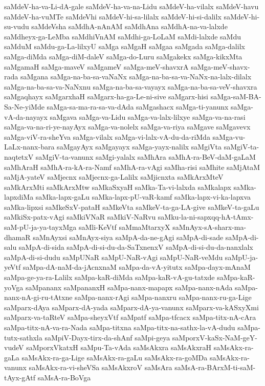 {saMdeV-ha-va-Li-dA-gale
saMdeV-ha-va-na-Lidu
saMdeV-ha-vilalx
saMdeV-havu
saMdeV-ha-vuMTe
saMdeVhi
saMdeV-hi-sa-lilalx
saMdeV-hi-si-dalilx
saMdeV-hi-su-vudu
saMdeVsha
saMdhA-nAnAM
saMdhAna
saMdhA-na-va-lalxde
saMdheyx-ga-LeMba
saMdhiVnAM
saMdhi-ga-LoLaM
saMdi-lalxde
saMdu
saMduM
saMdu-ga-La-lilxyU
saMga
saMgaH
saMgaa
saMgada
saMga-dalilx
saMga-diMda
saMga-diM-daleV
saMga-do-Luru
saMgakekx
saMga-kikxMta
saMgamaH
saMga-maveV
saMgameV
saMga-meV-shavxrA
saMga-meV-shavx-rada
saMgana
saMga-na-ba-sa-vaNaNx
saMga-na-ba-sa-va-NaNx-na-lalx-dilalx
saMga-na-ba-sa-va-NaNxnu
saMga-na-ba-sa-vayayx
saMga-na-ba-sa-veV-shavxra
saMgaqhayx
saMgarxhaH
saMgarx-ha-ga-Le-ni-sive
saMgarx-hisi
saMga-saM-BA-Sa-Ne-yiMde
saMga-sa-ma-ra-sa-va-dAda
saMgashacx
saMga-ti-yanunx
saMga-vA-da-nayayx
saMgava
saMga-va-Lidu
saMga-va-lalx-lilxye
saMga-va-na-rasi
saMga-va-na-ri-ye-nayAyx
saMga-va-nolelx
saMga-va-riya
saMgave
saMgavevx
saMga-viV-ra-sheYva
saMga-vilalx
saMga-vi-lalx-vA-du-da-riMda
saMga-vu-LaLx-nanx-bara
saMgayAyx
saMgayayx
saMga-yayx-nalilx
saMgiVta
saMgiV-ta-naqtetxV
saMgiV-ta-vanunx
saMgi-yalalx
saMhAra
saMhA-ra-BeV-daM-gaLaM
saMhAraH
saMhA-ra-kA-ra-Namf
saMhA-ra-vAgi
saMha-risi
saMhite
saMjAtaM
saMjA-yateV
saMjecnx
saMjecnx-ga-Lalilx
saMjicnxta
saMkArxMteV
saMkArxMti
saMkArxMtw
saMkaSxyaH
saMka-Ta-vi-lalxda
saMkalapx
saMka-lapxdiMa
saMka-lapx-gaLu
saMka-lapx-pU-vaR-kamf
saMka-lapx-vi-ka-lapxva
saMka-lipxsi
saMkeSxV-pataH
saMkeVta
saMkeV-ta-ga-LA-give
saMkeV-ta-gaLu
saMkiSx-patx-vAgi
saMkiVNaR
saMkiV-NaRvu
saMku-la-ni-sapxqq-hA-tAmx-saM-pU-ja-ya-tayxMga
saMli-KeVtf
saMmaMtarxyX
saMnAyx-sA-sharx-ma-dhamaR
saMnAyxsi
saMnAyx-siya
saMpA-da-ne-gAgi
saMpA-di-sade
saMpA-di-salu
saMpA-di-sida
saMpA-di-si-du-da-SaTxnenxV
saMpA-di-si-du-da-nanxlalx
saMpA-di-si-dudu
saMpUNaR
saMpU-NaR-vAgi
saMpU-NaR-veMdu
saMpU-ja-yeVtf
saMpa-dA-naM-da-jAcnxnaM
saMpa-da-vA-yitutx
saMpa-dayx-mAnaM
saMpa-ge-ya-ra-Lalilx
saMpa-kaR-diMda
saMpa-kaR-vA-gu-tatxde
saMpa-kaR-yoVga
saMpananx
saMpananxH
saMpa-nanx-mapapx
saMpa-nanx-nAda
saMpa-nanx-nA-gi-ru-tAtxne
saMpa-nanx-rAgi
saMpa-nanxru
saMpa-nanx-ru-ga-Lige
saMparx-dAya
saMparx-dA-yada
saMparx-dA-ya-vanunx
saMparx-va-kASxyXmi
saMparx-va-taRteV
saMpa-sheyxVtf
saMpatf
saMpa-tfcacx
saMpa-titx-nA-cAra
saMpa-titx-nA-va-ra-Nada
saMpa-titxna
saMpa-titx-na-sathx-la-vA-dudu
saMpa-tutx-sathxla
saMpiV-Dayx-tirx-da-shAnf
saMpi-geya
saMporxV-kaSx-NaM-geY-vudeV
saMporxVkatxH
saMpu-Ta-vAda
saMsAkxra
saMsAkxraH
saMsAkx-ra-gaLa
saMsAkx-ra-ga-Lige
saMsAkx-ra-gaLu
saMsAkx-ra-goMDa
saMsAkx-ra-vanunx
saMsAkx-ra-vi-sheVSa
saMsAkxroV
saMsAra
saMsA-ra-BArxM-ti-saM-tAyx-gAtf
saMsA-ra-BoVga
}
